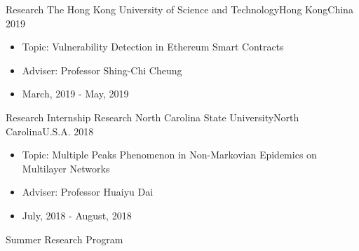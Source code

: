 %
%
%
\begin{experiences}
	\experience
	{Research} {The Hong Kong University of Science and Technology}{Hong Kong}{China}
	{2019}    {
		\begin{itemize}
			\item Topic: Vulnerability Detection in Ethereum Smart Contracts
			\item Adviser: Professor Shing-Chi Cheung
			\item March, 2019 - May, 2019
		\end{itemize}
	}
	{Research Internship}
	\emptySeparator
	\experience
	{Research}   {North Carolina State University}{North Carolina}{U.S.A.}
	{2018} {
		\begin{itemize}
			\item Topic: Multiple Peaks Phenomenon in Non-Markovian Epidemics on Multilayer Networks
			\item Adviser: Professor Huaiyu Dai
			\item July, 2018 - August, 2018
		\end{itemize}
	}
	{Summer Research Program}
\end{experiences}
